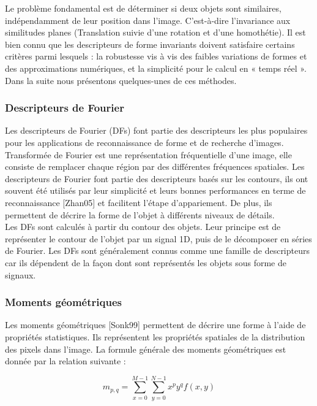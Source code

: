 Le problème fondamental est de déterminer si deux objets sont similaires, indépendamment
de leur position dans l’image. C’est-à-dire l’invariance aux similitudes planes (Translation suivie d'une rotation et d’une homothétie). Il est bien connu que les descripteurs de forme invariants doivent satisfaire certains critères parmi lesquels : la robustesse vis à vis des faibles variations de formes et des approximations numériques, et la simplicité pour le calcul en « temps réel ».\\

Dans la suite nous présentons quelques-unes de ces méthodes.

\subsubsection{Descripteurs de Fourier}
Les descripteurs de Fourier (DFs) font partie des descripteurs les plus populaires pour les applications de reconnaissance de forme et de recherche d'images. Transformée de Fourier est une représentation fréquentielle d’une image, elle consiste de remplacer chaque région par des différentes fréquences spatiales. Les descripteurs de Fourier font partie des descripteurs basés sur les contours, ils ont souvent été utilisés par leur simplicité et leurs bonnes performances en terme de reconnaissance [Zhan05] et facilitent l'étape d’appariement. De plus, ils permettent de décrire la forme de l’objet à différents niveaux de détails.\\

Les DFs sont calculés à partir du contour des objets. Leur principe est de représenter le contour de l'objet par un signal 1D, puis de le décomposer en séries de Fourier. Les DFs sont généralement connus comme une famille de descripteurs car ils dépendent de la façon dont sont représentés les objets sous forme de signaux.

\subsubsection{Moments géométriques}
Les moments géométriques [Sonk99] permettent de décrire une forme à l’aide de propriétés
statistiques. Ils représentent les propriétés spatiales de la distribution des pixels dans l’image. La formule générale des moments géométriques est donnée par la relation suivante :

\begin{equation}
	m_{p,q} = \sum_{x=0}^{M-1}\sum_{y=0}^{N-1} x^p y^q f(x, y)
\end{equation}

